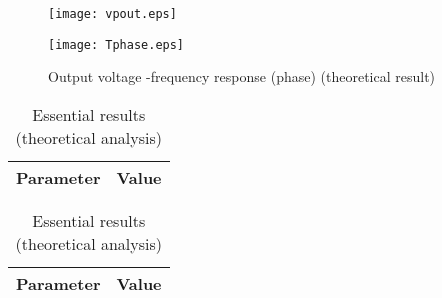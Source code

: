 \begin{figure}[h] \centering
  \begin{minipage}{.45\textwidth}
    \texttt{[image: vpout.eps]}
    \caption{Output voltage -frequency response (phase) (simulation result)}
    \label{fig:vpout}
  \end{minipage}%
    \hspace{2 mm}
  \begin{minipage}{.45\textwidth}
  \centering
    \texttt{[image: Tphase.eps]}
    \caption{Output voltage -frequency response (phase) (theoretical result)}
    \label{fig:compvpout}
      \end{minipage}%
\end{figure}

\newpage

\begin{table}[!htb]
  \begin{minipage}{.5\linewidth}
     \centering
  \begin{tabular}{|c|c|}
    \hline    
    {\bf Parameter} & {\bf Value} \\ \hline
    
    
 \end{tabular}
 \caption{Essential results (simulation analysis)}
 \label{tab:sim}
  \end{minipage}
    \hspace{2 mm}
    \begin{minipage}{.5\linewidth}
      \centering
        \begin{tabular}{|c|c|}
    \hline    
    {\bf Parameter} & {\bf Value} \\ \hline
    
    
 \end{tabular}
        \caption{Essential results (theoretical analysis)}
        \label{tab:compsim}
    \end{minipage} 
\end{table}



